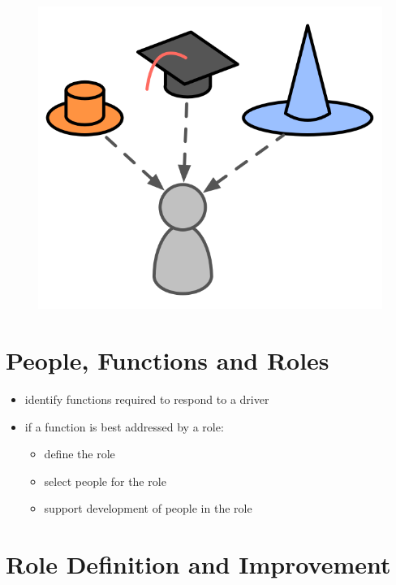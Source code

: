 \begin{figure}[htbp]
\centering
\includegraphics[keepaspectratio,width=\textwidth,height=0.75\textheight]{img/people-and-roles/roles.png}
\end{figure}

\section{People, Functions and Roles}
\label{peoplefunctionsandroles}

\begin{itemize}
\item identify functions required to respond to a driver

\item if a function is best addressed by a role:

\begin{itemize}
\item define the role

\item select people for the role

\item support development of people in the role

\end{itemize}

\end{itemize}

\section{Role Definition and Improvement}
\label{roledefinitionandimprovement}

